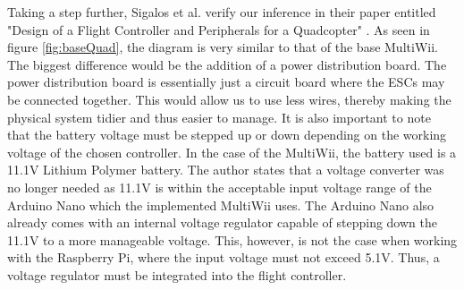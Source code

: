 \documentclass[english]{upeeei}
\begin{document}
\newline
\newline
Taking a step further, Sigalos et al. verify our inference in their paper entitled "Design of a Flight Controller and Peripherals 
for a Quadcopter" \cite{fcDesign2019}. As seen in figure \ref{fig:baseQuad}, the diagram is very similar to that of the base MultiWii. 
The biggest difference would be the addition of a power distribution board. The power distribution board is essentially just a circuit board
where the ESCs may be connected together. This would allow us to use less wires, thereby making the physical system tidier and thus 
easier to manage. It is also important to note that the battery voltage must be stepped up or down depending on the working voltage of
the chosen controller. In the case of the MultiWii, the battery used is a 11.1V Lithium Polymer battery. The author states that a voltage
converter was no longer needed as 11.1V is within the acceptable input voltage range of the Arduino Nano which the implemented MultiWii
uses. The Arduino Nano also already comes with an internal voltage regulator capable of stepping down the 11.1V to a more manageable
voltage. This, however, is not the case when working with the Raspberry Pi, where the input voltage must not exceed 5.1V. Thus, a
voltage regulator must be integrated into the flight controller.
\end{document}
